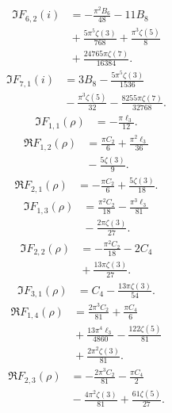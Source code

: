 \begin{align*}
\Im F_{6,2}(i) &=-\frac{\pi^{2} B_{6}}{48}-11 B_{8} \\
 &{}+\frac{5 \pi^{5} \zeta\left(3\right)}{768}+\frac{\pi^{3} \zeta\left(5\right)}{8} \\
 &{}+\frac{24765 \pi \zeta\left(7\right)}{16384}.
\end{align*}
\begin{align*}
\Im F_{7,1}(i) &=3 B_{8}-\frac{5 \pi^{5} \zeta\left(3\right)}{1536} \\
 &{}-\frac{\pi^{3} \zeta\left(5\right)}{32}-\frac{8255 \pi \zeta\left(7\right)}{32768}.
\end{align*}
\begin{align*}
\Im F_{1,1}(\rho) &=-\frac{\pi \ell_{3}}{12}.
\end{align*}
\begin{align*}
\Re F_{1,2}(\rho) &=\frac{\pi C_{2}}{6}+\frac{\pi^{2} \ell_{3}}{36} \\
 &{}-\frac{5 \zeta\left(3\right)}{9}.
\end{align*}
\begin{align*}
\Re F_{2,1}(\rho) &=-\frac{\pi C_{2}}{6}+\frac{5 \zeta\left(3\right)}{18}.
\end{align*}
\begin{align*}
\Im F_{1,3}(\rho) &=\frac{\pi^{2} C_{2}}{18}-\frac{\pi^{3} \ell_{3}}{81} \\
 &{}-\frac{2 \pi \zeta\left(3\right)}{27}.
\end{align*}
\begin{align*}
\Im F_{2,2}(\rho) &=-\frac{\pi^{2} C_{2}}{18}-2 C_{4} \\
 &{}+\frac{13 \pi \zeta\left(3\right)}{27}.
\end{align*}
\begin{align*}
\Im F_{3,1}(\rho) &=C_{4}-\frac{13 \pi \zeta\left(3\right)}{54}.
\end{align*}
\begin{align*}
\Re F_{1,4}(\rho) &=\frac{2 \pi^{3} C_{2}}{81}+\frac{\pi C_{4}}{6} \\
 &{}+\frac{13 \pi^{4} \ell_{3}}{4860}-\frac{122 \zeta\left(5\right)}{81} \\
 &{}+\frac{2 \pi^{2} \zeta\left(3\right)}{81}.
\end{align*}
\begin{align*}
\Re F_{2,3}(\rho) &=-\frac{2 \pi^{3} C_{2}}{81}-\frac{\pi C_{4}}{2} \\
 &{}-\frac{4 \pi^{2} \zeta\left(3\right)}{81}+\frac{61 \zeta\left(5\right)}{27}.
\end{align*}
